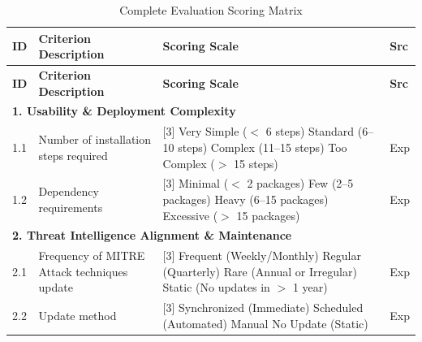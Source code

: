 \begin{longtable}{|l|p{4cm}|p{8cm}|l|}
    \caption{Complete Evaluation Scoring Matrix}
    \label{tab:bas_evaluation_matrix_complete} \\
    \hline
    \textbf{ID} & \textbf{Criterion Description} & \textbf{Scoring Scale} & \textbf{Src} \\
    \hline
    \endfirsthead
    \hline
    \textbf{ID} & \textbf{Criterion Description} & \textbf{Scoring Scale} & \textbf{Src} \\
    \hline
    \endhead
    
    \multicolumn{4}{|l|}{\textbf{1. Usability \& Deployment Complexity}} \\
\hline
    1.1 & Number of installation steps required ~\cite{landauer2024} & 
    [3] Very Simple ($<$ 6 steps) \newline 
    [2] Standard (6--10 steps) \newline 
    [1] Complex (11--15 steps) \newline 
    [0] Too Complex ($>$ 15 steps) & Exp \\ \hline
    1.2 & Dependency requirements ~\cite{landauer2024} & 
    [3] Minimal ($<$ 2 packages) \newline 
    [2] Few (2--5 packages) \newline 
    [1] Heavy (6--15 packages) \newline 
    [0] Excessive ($>$ 15 packages) & Exp \\ \hline
    
    \multicolumn{4}{|l|}{\textbf{2. Threat Intelligence Alignment \& Maintenance}} \\
    \hline
    2.1 & Frequency of MITRE Attack techniques update ~\cite{wang2025} & 
    [3] Frequent (Weekly/Monthly) \newline 
    [2] Regular (Quarterly) \newline 
    [1] Rare (Annual or Irregular) \newline 
    [0] Static (No updates in $>$ 1 year) & Exp \\ \hline
    2.2 & Update method ~\cite{wang2025} & 
    [3] Synchronized (Immediate) \newline 
    [2] Scheduled (Automated) \newline 
    [1] Manual \newline 
    [0] No Update (Static) & Exp \\ \hline
    

\end{longtable}
